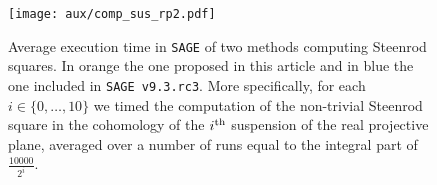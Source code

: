 
\begin{figure}
	\texttt{[image: aux/comp\_sus\_rp2.pdf]}
	\caption{Average execution time in \texttt{SAGE} of two methods computing Steenrod squares. In orange the one proposed in this article and in blue the one included in \texttt{SAGE v9.3.rc3}. More specifically, for each $i \in \{0, \dots, 10\}$ we timed the computation of the non-trivial Steenrod square in the cohomology of the $i^{\mathrm{th}}$ suspension of the real projective plane, averaged over a number of runs equal to the integral part of $\frac{10000}{2^i}$.}
	\label{f:comparison}
\end{figure}